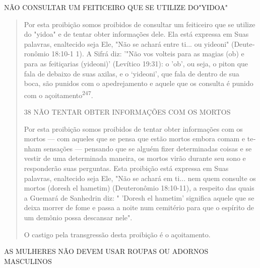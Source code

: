 NÃO CONSULTAR UM FEITICEIRO QUE SE UTILIZE DO"YIDOA"

\begin{quote}
Por esta proibição somos proibidos de consultar um feiticeiro que se
utilize do "yidoa" e de tentar obter informações dele. Ela está expressa
em Suas palavras, enaltecido seja Ele, "Não se achará entre ti... ou
yideoni" (Deute­ronômio 18:10-1 1). A Sifrá diz: '"Não vos volteis para
as magias (ob) e para as feitiçarias (yideoni)' (Levítico 19:31): o
'ob', ou seja, o piton que fala de debaixo de suas axilas, e o
`yideoni', que fala de dentro de sua boca, são punidos com o
apedrejamento e aquele que os consulta é punido com o
açoitamento\textsuperscript{247}.

38 NÃO TENTAR OBTER INFORMAÇÕES COM OS MORTOS

Por esta proibição somos proibidos de tentar obter informações com os
mortos --- com aqueles que se pensa que estão mortos embora comam e
te­nham sensações --- pensando que se alguém fizer determinadas coisas e
se vestir de uma determinada maneira, os mortos virão durante seu sono e
responderão suas perguntas. Esta proibição está expressa em Suas
palavras, enaltecido seja Ele, "Não se achará em ti... nem quem consulte
os mortos (doresh el hametim) (Deuteronômio 18:10-11), a respeito das
quais a Guemará de Sanhedrin diz: " 'Do­resh el hametim' significa
aquele que se deixa morrer de fome e passa a noite num cemitério para
que o espírito de um demônio possa descansar nele".

O castigo pela transgressão desta proibição é o açoitamento.
\end{quote}

AS MULHERES NÃO DEVEM USAR ROUPAS OU ADORNOS MASCULINOS

